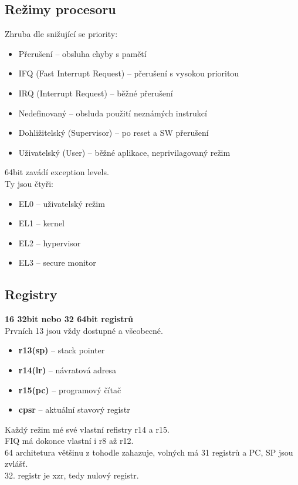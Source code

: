 \documentclass[
]{cz_sablona}
\begin{document}
\subsection{Režimy procesoru}
Zhruba dle snižující se priority:
\begin{itemize}
    \item Přerušení -- obsluha chyby s pamětí
    \item IFQ (Fast Interrupt Request) --
    přerušení s vysokou prioritou
    \item IRQ (Interrupt Request) --
    běžné přerušení
    \item Nedefinovaný -- 
    obsluda použití neznámých instrukcí
    \item Dohližitelský (Supervisor) --
    po reset a SW přerušení
    \item Uživatelský (User) --
    běžné aplikace, neprivilagovaný režim
\end{itemize}
64bit zavádí exception levels.\\
Ty jsou čtyři:
\begin{itemize}
    \item EL0 -- uživatelský režim
    \item EL1 -- kernel
    \item EL2 -- hypervisor
    \item EL3 -- secure monitor
\end{itemize}
\subsection{Registry}
\textbf{16 32bit nebo 32 64bit registrů}\\
Prvních 13 jsou vždy dostupné a všeobecné.
\begin{itemize}
    \item \textbf{r13(sp)} -- stack pointer
    \item \textbf{r14(lr)} -- návratová adresa
    \item \textbf{r15(pc)} -- programový čítač
    \item \textbf{cpsr} -- aktuální stavový registr
\end{itemize}
Každý režim mé své vlastní refistry r14 a r15.\\
FIQ má dokonce vlastní i r8 až r12.
\\[0.5em]
64 architetura většinu z tohodle zahazuje,
volných má 31 registrů a PC, SP jsou zvlášť.\\
32. registr je xzr, tedy nulový registr.
\end{document}
